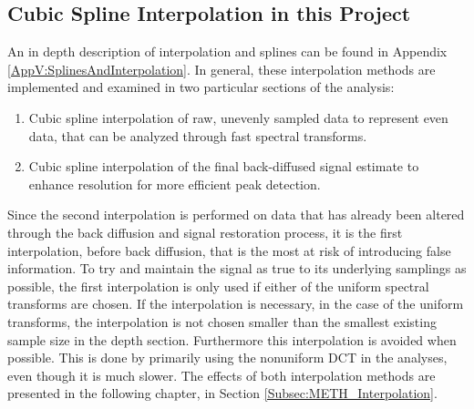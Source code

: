 \documentclass[../../CompleteThesis2/Complete_2ndDraft]{subfiles}
\begin{document}
\subsection[Interpolation in this Project][Interpolation in this Project]{Cubic Spline Interpolation in this Project}
\label{Subsec:CompMeths_SplinesAndInterpolation_InterpolationInThisProj}

An in depth description of interpolation and splines can be found in Appendix \ref{AppV:SplinesAndInterpolation}. In general, these interpolation methods are implemented and examined in two particular sections of the analysis: 
\begin{enumerate}
	\item Cubic spline interpolation of raw, unevenly sampled data to represent even data, that can be analyzed through fast spectral transforms.
	\item Cubic spline interpolation of the final back-diffused signal estimate to enhance resolution for more efficient peak detection.
\end{enumerate}

Since the second interpolation is performed on data that has already been altered through the back diffusion and signal restoration process, it is the first interpolation, before back diffusion, that is the most at risk of introducing false information. To try and maintain the signal as true to its underlying samplings as possible, the first interpolation is only used if either of the uniform spectral transforms are chosen. If the interpolation is necessary, in the case of the uniform transforms, the interpolation is not chosen smaller than the smallest existing sample size in the depth section. Furthermore this interpolation is avoided when possible. This is done by primarily using the nonuniform DCT in the analyses, even though it is much slower.
The effects of both interpolation methods are presented in the following chapter, in Section \ref{Subsec:METH_Interpolation}. 
\end{document}
